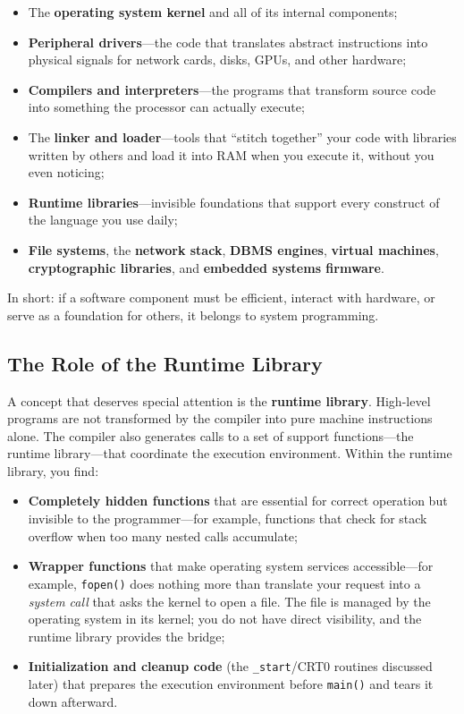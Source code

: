 \begin{itemize}
    \item The \textbf{operating system kernel} and all of its internal components;
    \item \textbf{Peripheral drivers}---the code that translates abstract instructions into physical signals for network cards, disks, GPUs, and other hardware;
    \item \textbf{Compilers and interpreters}---the programs that transform source code into something the processor can actually execute;
    \item The \textbf{linker and loader}---tools that ``stitch together'' your code with libraries written by others and load it into RAM when you execute it, without you even noticing;
    \item \textbf{Runtime libraries}---invisible foundations that support every construct of the language you use daily;
    \item \textbf{File systems}, the \textbf{network stack}, \textbf{DBMS engines}, \textbf{virtual machines}, \textbf{cryptographic libraries}, and \textbf{embedded systems firmware}.
\end{itemize}

In short: if a software component must be efficient, interact with hardware, or serve as a foundation for others, it belongs to system programming.

\subsection{The Role of the Runtime Library}

A concept that deserves special attention is the \textbf{runtime library}. High-level programs are not transformed by the compiler into pure machine instructions alone. The compiler also generates calls to a set of support functions---the runtime library---that coordinate the execution environment. Within the runtime library, you find:

\begin{itemize}
    \item \textbf{Completely hidden functions} that are essential for correct operation but invisible to the programmer---for example, functions that check for stack overflow when too many nested calls accumulate;
    \item \textbf{Wrapper functions} that make operating system services accessible---for example, \texttt{fopen()} does nothing more than translate your request into a \emph{system call} that asks the kernel to open a file. The file is managed by the operating system in its kernel; you do not have direct visibility, and the runtime library provides the bridge;
    \item \textbf{Initialization and cleanup code} (the \texttt{\_start}/CRT0 routines discussed later) that prepares the execution environment before \texttt{main()} and tears it down afterward.
\end{itemize}

